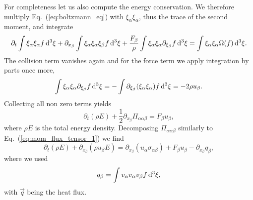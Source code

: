 For completeness let us also compute the energy conservation. 
We therefore multiply Eq.~(\ref{eq:boltzmann_eq}) with $\xi_{\alpha}\xi_{\alpha}$, thus the trace of the second moment, and integrate
\begin{equation}\label{eq:boltzmann_energy_cons}
    \partial_t\int\xi_{\alpha}\xi_{\alpha}f\mathop{}\!\mathrm{d}^3\xi + \partial_{x_{\beta}}\int\xi_{\alpha}\xi_{\alpha}\xi_{\beta} f\mathop{}\!\mathrm{d}^3\xi + \frac{F_{\beta}}{\rho}\int\xi_{\alpha}\xi_{\alpha}\partial_{\xi_{\beta}}f\mathop{}\!\mathrm{d}^3\xi = \int\xi_{\alpha}\xi_{\alpha}\Omega(f)\mathop{}\!\mathrm{d}^3\xi.
\end{equation}
The collision term vanishes again and for the force term we apply integration by parts once more,
\begin{equation}
    \int\xi_{\alpha}\xi_{\alpha}\partial_{\xi_{\beta}}f\mathop{}\!\mathrm{d}^3\xi = -\int\partial_{\xi_{\beta}}(\xi_{\alpha}\xi_{\alpha})f\mathop{}\!\mathrm{d}^3\xi = -2\rho u_{\beta}.
\end{equation}
Collecting all non zero terms yields
\begin{equation}
    \partial_t(\rho E) + \frac{1}{2}\partial_{x_{\beta}}\Pi_{\alpha\alpha\beta} = F_{\beta}u_{\beta},
\end{equation}
where $\rho E$ is the total energy density.
Decomposing $\Pi_{\alpha\alpha\beta}$ similarly to Eq.~(\ref{eq:mom_flux_tensor_1}) we find
\begin{equation}
    \partial_t(\rho E) + \partial_{x_{\beta}}(\rho u_{\beta}E) = \partial_{x_{\beta}}(u_{\alpha}\sigma_{\alpha\beta}) + F_{\beta}u_{\beta} -\partial_{x_{\beta}}q_{\beta},
\end{equation}
where we used
\begin{equation}\label{eq:boltzmann_heat_flux}
    q_{\beta} = \int v_{\alpha}v_{\alpha}v_{\beta}f\mathop{}\!\mathrm{d}^3\xi, 
\end{equation}
with $\vec{q}$ being the heat flux.

